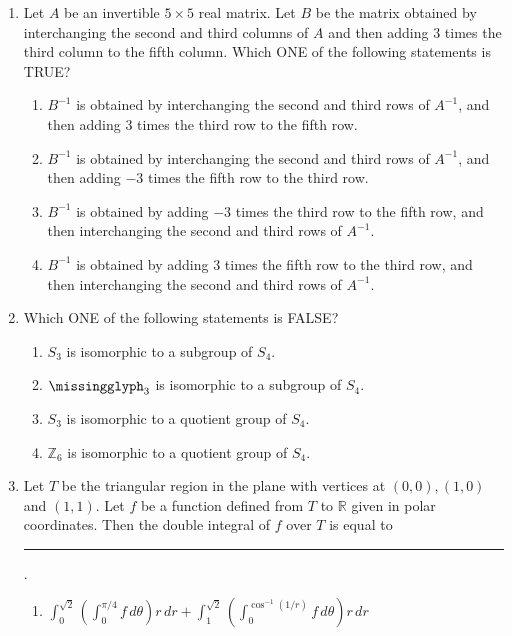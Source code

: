 \begin{enumerate}
\begin{enumerate}[label=(\Alph*)]
\item $f'(x)=0$ for infinitely many $x\in\mathbb R\setminus\mathbb Z$.
\item $f''(n)=0$ for all $n\in\missingglyph$.
\item $f''(x)=0$ for infinitely many $x\in\mathbb R\setminus\missingglyph$.
\end{enumerate}
\item Let $A$ be an invertible $5\times5$ real matrix. Let $B$ be the matrix obtained by interchanging the second and third columns of $A$ and then adding $3$ times the third column to the fifth column. Which ONE of the following statements is TRUE?
\begin{enumerate}[label=(\Alph*)]
\item $B^{-1}$ is obtained by interchanging the second and third rows of $A^{-1}$, and then adding $3$ times the third row to the fifth row.
\item $B^{-1}$ is obtained by interchanging the second and third rows of $A^{-1}$, and then adding $-3$ times the fifth row to the third row.
\item $B^{-1}$ is obtained by adding $-3$ times the third row to the fifth row, and then interchanging the second and third rows of $A^{-1}$.
\item $B^{-1}$ is obtained by adding $3$ times the fifth row to the third row, and then interchanging the second and third rows of $A^{-1}$.
\end{enumerate}
\item Which ONE of the following statements is FALSE?
\begin{enumerate}[label=(\Alph*)]
\item $S_3$ is isomorphic to a subgroup of $S_4$.
\item $\missingglyph_3$ is isomorphic to a subgroup of $S_4$.
\item $S_3$ is isomorphic to a quotient group of $S_4$.
\item $\mathbb Z_6$ is isomorphic to a quotient group of $S_4$.
\end{enumerate}
\item Let $T$ be the triangular region in the plane with vertices at $(0,0),(1,0)$ and $(1,1)$. Let $f$ be a function defined from $T$ to $\mathbb R$ given in polar coordinates. Then the double integral of $f$ over $T$ is equal to \rule{2cm}{0.4pt}.
\begin{enumerate}[label=(\Alph*)]
\item $\displaystyle\int_0^{\sqrt2}\left(\int_0^{\pi/4}f\,d\theta\right)r\,dr+\int_1^{\sqrt2}\left(\int_0^{\cos^{-1}(1/r)}f\,d\theta\right)r\,dr$

\end{enumerate}
\end{enumerate}
